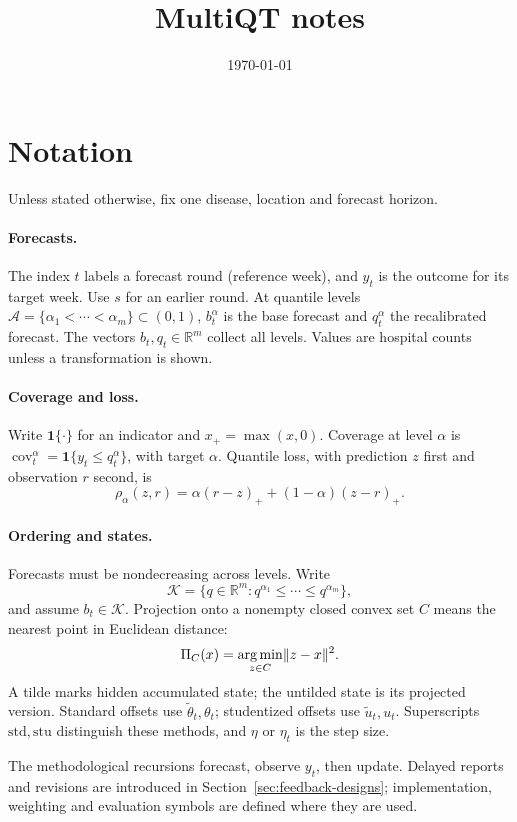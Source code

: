 \documentclass[11pt,a4paper]{article}
\title{MultiQT notes}
\author{} %
\date{\today}
\newcommand{\R}{\mathbb{R}}
\newcommand{\A}{\mathcal{A}}
\newcommand{\K}{\mathcal{K}}
\newcommand{\ind}{\mathbf{1}}
\newcommand{\std}{\mathrm{std}}
\newcommand{\stu}{\mathrm{stu}}
\DeclareMathOperator{\cov}{cov}
\DeclareMathOperator*{\argmin}{arg\,min}
\DeclarePairedDelimiter{\norm}{\lVert}{\rVert}
\theoremstyle{definition}
\theoremstyle{remark}
\begin{document}
\maketitle

\section{Notation}
\label{sec:notation}
Unless stated otherwise, fix one disease, location and forecast horizon.

\paragraph{Forecasts.}
The index $t$ labels a forecast round (reference week), and $y_t$ is
the outcome for its target week. Use $s$ for an earlier round.
At quantile levels $\A=\{\alpha_1<\cdots<\alpha_m\}\subset(0,1)$,
$b_t^\alpha$ is the base forecast and $q_t^\alpha$ the recalibrated
forecast. The vectors $b_t,q_t\in\R^m$ collect all levels. Values are
hospital counts unless a transformation is shown.

\paragraph{Coverage and loss.}
Write $\ind\{\cdot\}$ for an indicator and $x_+=\max(x,0)$.
Coverage at level $\alpha$ is
$\cov_t^\alpha=\ind\{y_t\le q_t^\alpha\}$, with target $\alpha$.
Quantile loss, with prediction $z$ first and observation $r$ second, is
\begin{equation}
 \rho_\alpha(z,r)=\alpha(r-z)_++(1-\alpha)(z-r)_+.
 \label{eq:quantile-loss}
\end{equation}

\paragraph{Ordering and states.}
Forecasts must be nondecreasing across levels. Write
\[
 \K=\{q\in\R^m:q^{\alpha_1}\le\cdots\le q^{\alpha_m}\},
\]
and assume $b_t\in\K$. Projection onto a nonempty closed convex set
$C$ means the nearest point in Euclidean distance:
\[
 \Pi_C(x)=\argmin_{z\in C}\norm{z-x}^2.
\]
A tilde marks hidden accumulated state; the untilded state is its
projected version. Standard offsets use $\tilde\theta_t,\theta_t$;
studentized offsets use $\tilde u_t,u_t$. Superscripts $\std,\stu$
distinguish these methods, and $\eta$ or $\eta_t$ is the step size.

The methodological recursions forecast, observe $y_t$, then update.
Delayed reports and revisions are introduced in
Section~\ref{sec:feedback-designs}; implementation, weighting and
evaluation symbols are defined where they are used.
\end{document}
